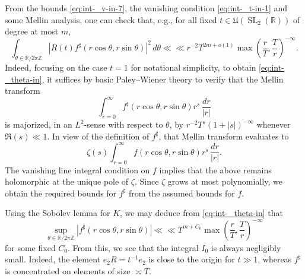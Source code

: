 \documentclass[reqno]{amsart}
\DeclareMathOperator{\SL}{SL}
\theoremstyle{plain} \newtheorem{theorem} {Theorem}
\theoremstyle{definition} \newtheorem{definition} [theorem] {Definition}
\theoremstyle{itplain} %
\numberwithin{equation}{section}
\numberwithin{theorem}{section}
\begin{document}
From the bounds \eqref{eq:int-_v-in-7}, the vanishing condition \eqref{eq:int-_t-in-1} and some Mellin analysis, one can check that, e.g., for all fixed $t \in \mathfrak{U}(\SL_2(\mathbb{R}))$ of degree at most $m$,
\begin{equation}\label{eq:int-_theta-in}
  \int _{\theta \in \mathbb{R} / 2 \pi \mathbb{Z} }
  \left\lvert R(t) f ^\sharp  (r \cos \theta, r \sin \theta ) \right\rvert^2
  \, d \theta
  \ll
  \ll r^{-2} T^{2 m + o(1)} \max \left( \frac{r}{T}, \frac{T}{r} \right)^{-\infty}.
\end{equation}
Indeed, focusing on the case $t=1$ for notational simplicity, to obtain \eqref{eq:int-_theta-in}, it suffices by basic Paley--Wiener theory to verify that the Mellin transform
\begin{equation*}
  \int _{r =0}^{\infty}
  f ^\sharp (r \cos \theta, r \sin \theta )
  r^s \, \frac{d r}{|r|}
\end{equation*}
is majorized, in an $L^2$-sense with respect to $\theta$, by $r^{-2} T^{s} (1 + |s|)^{-\infty}$ whenever $\Re(s) \ll 1$.  In view of the definition of $f ^\sharp$, that Mellin transform evaluates to
\begin{equation*}
  \zeta(s)
  \int _{r =0}^{\infty}
  f  (r \cos \theta, r \sin \theta )
  r^s \, \frac{d r}{|r|}.
\end{equation*}
The vanishing line integral condition on $f$ implies that the above remains holomorphic at the unique pole of $\zeta$.  Since $\zeta$ grows at most polynomially, we obtain the required bounds for $f ^\sharp $ from the assumed bounds for $f$.

Using the Sobolev lemma for $K$, we may deduce from \eqref{eq:int-_theta-in} that
\begin{equation*}
  \sup _{\theta \in \mathbb{R} / 2 \pi \mathbb{Z} }
  \left\lvert f ^\sharp  (r \cos \theta, r \sin \theta ) \right\rvert
  \ll
  \ll T^{m + C_0} \max \left( \frac{r}{T}, \frac{T}{r} \right)^{-\infty}
\end{equation*}
for some fixed $C_0$.
From this, we see that the integral $I_0$ is always negligibly small.  Indeed, the element $e_2 R = t^{-1} e_2$ is close to the origin for $t \gg 1$, whereas $f ^\sharp $ is concentrated on elements of size $\asymp T$.
\end{document}
